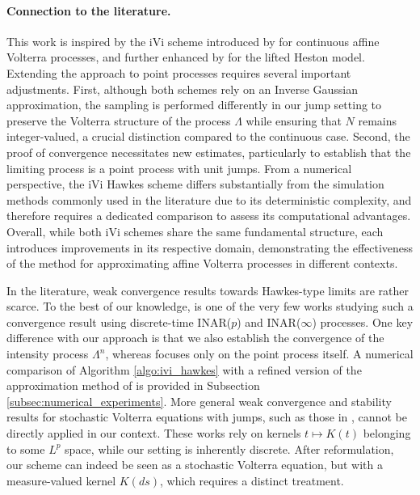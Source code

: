 \documentclass{article}
\newcommand{\1}{\mathbbm{1}}
\numberwithin{equation}{section}
\begin{document}
\paragraph{Connection to the literature.} 
This work is inspired by the iVi scheme introduced by \citet{jaber2024simulation, jaber2025simulating} for continuous affine Volterra processes, and further enhanced by \citet{zaugg2025liftedhestonmodelefficient} for the lifted Heston model. Extending the approach to point processes requires several important adjustments. First, although both schemes rely on an Inverse Gaussian approximation, the sampling is performed differently in our jump setting to preserve the Volterra structure of the process $\Lambda$ while ensuring that $N$ remains integer-valued, a crucial distinction compared to the continuous case. Second, the proof of convergence necessitates new estimates, particularly to establish that the limiting process is a point process with unit jumps. From a numerical perspective, the iVi Hawkes scheme differs substantially from the simulation methods commonly used in the literature due to its deterministic complexity, and therefore requires a dedicated comparison to assess its computational advantages. Overall, while both iVi schemes share the same fundamental structure, each introduces improvements in its respective domain, demonstrating the effectiveness of the method for approximating affine Volterra processes in different contexts.

In the literature, weak convergence results towards Hawkes-type limits are rather scarce. To the best of our knowledge, \cite{kirchner2016hawkes,kirchner2017estimation} is one of the very few works studying such a convergence result using discrete-time  INAR($p$) and INAR($\infty$) processes. One key difference with our approach is that we also establish the convergence of the intensity process $\Lambda^n$, whereas \cite{kirchner2016hawkes} focuses only on the point process itself. A numerical comparison of Algorithm \ref{algo:ivi_hawkes} with a refined version of the approximation method of \citet{kirchner2016hawkes, kirchner2017estimation} is provided in Subsection \ref{subsec:numerical_experiments}.  More general weak convergence and stability results for stochastic Volterra equations with jumps, such as those in \cite*{abi2021weak, abietal2021weak}, cannot be directly applied in our context. These works rely on kernels $t \mapsto K(t)$ belonging to some $L^p$ space, while our setting is inherently discrete. After reformulation, our scheme can indeed be seen as a stochastic Volterra equation, but with a measure-valued kernel $K(ds)$, which requires a distinct treatment.
\end{document}
